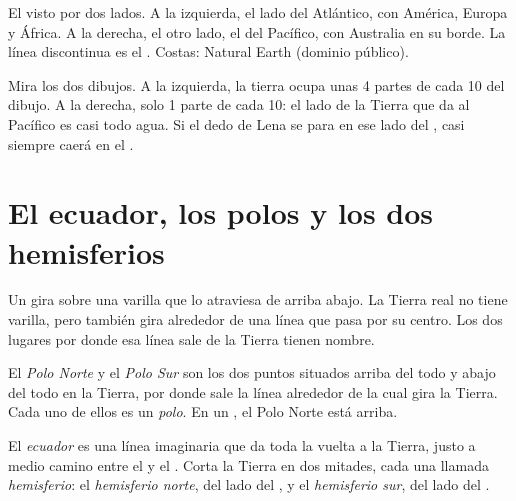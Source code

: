\begin{omfigure}
{\small El  visto por dos lados. A la izquierda, el lado del
 Atlántico, con América, Europa y África. A la derecha, el otro lado,
el del  Pacífico, con Australia en su borde. La línea discontinua es
el . Costas: Natural Earth (dominio público).}
\label{fig:g3:continents-and-oceans:globes}
\end{omfigure}

\begin{remark}\label{rem:g3:continents-and-oceans:halves}
Mira los dos dibujos. A la izquierda, la tierra ocupa unas 4 partes de cada
10 del dibujo. A la derecha, solo 1 parte de cada 10: el lado de la Tierra
que da al Pacífico es casi todo agua. Si el dedo de Lena se para en ese
lado del , casi siempre caerá en el .
\end{remark}

\section{El ecuador, los polos y los dos hemisferios}

Un  gira sobre una varilla que lo atraviesa de arriba abajo.
La Tierra real no tiene varilla, pero también gira alrededor de una línea
que pasa por su centro. Los dos lugares por donde esa línea sale de la
Tierra tienen nombre.

\begin{definition}[Polo]\label{def:g3:continents-and-oceans:poles}
El \emph{Polo Norte} y el \emph{Polo
Sur} son los dos puntos situados arriba del todo y abajo
del todo en la Tierra, por donde sale la línea alrededor de la cual gira la
Tierra. Cada uno de ellos es un \emph{polo}. En un , el Polo Norte está arriba.
\end{definition}

\begin{definition}\label{def:g3:continents-and-oceans:equator}
El \emph{ecuador} es una línea imaginaria que da toda la
vuelta a la Tierra, justo a medio camino entre el  y el .
Corta la Tierra en dos mitades, cada una llamada
\emph{hemisferio}: el \emph{hemisferio
norte}, del lado del , y el
\emph{hemisferio sur}, del lado del .
\end{definition}

